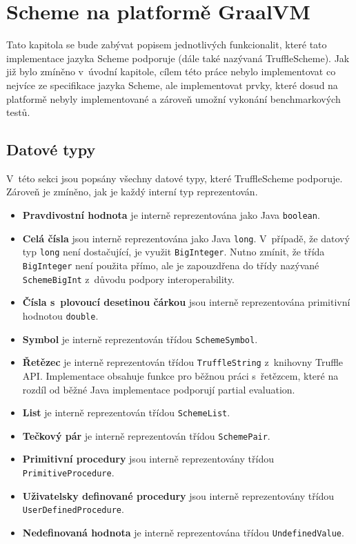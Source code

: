 \documentclass[
  master,
  biblatex,
  figures=true,
  theorems,
  sourcecodes,
  glossaries,
  index
]{kidiplom}
\begin{document}
\clearpage


\section{Scheme na platformě GraalVM}
\label{chapter-scheme-on-graalvm-platform}
Tato kapitola se bude zabývat popisem jednotlivých funkcionalit, které tato implementace jazyka Scheme podporuje (dále také nazývaná TruffleScheme). Jak již bylo zmíněno v~úvodní kapitole, cílem této práce nebylo implementovat co nejvíce ze specifikace jazyka Scheme, ale implementovat prvky, které dosud na platformě nebyly implementované a zároveň umožní vykonání benchmarkových testů.


\subsection{Datové typy}
V~této sekci jsou popsány všechny datové typy, které TruffleScheme podporuje. Zároveň je zmíněno, jak je každý interní typ reprezentován.

\begin{itemize}
    \item \textbf{Pravdivostní hodnota} je interně reprezentována jako Java \texttt{boolean}.
    \item \textbf{Celá čísla} jsou interně reprezentována jako Java \texttt{long}. V~případě, že datový typ \texttt{long} není dostačující, je využit \texttt{BigInteger}. Nutno zmínit, že třída \texttt{BigInteger} není použita přímo, ale je zapouzdřena do třídy nazývané \texttt{SchemeBigInt} z~důvodu podpory interoperability.
    \item \textbf{Čísla s~plovoucí desetinou čárkou} jsou interně reprezentována primitivní hodnotou \texttt{double}.
    \item \textbf{Symbol} je interně reprezentován třídou \texttt{SchemeSymbol}.
    \item \textbf{Řetězec} je interně reprezentován třídou \texttt{TruffleString} z~knihovny Truffle API. Implementace obsahuje funkce pro běžnou práci s~řetězcem, které na rozdíl od běžné Java implementace podporují partial evaluation.
    \item \textbf{List} je interně reprezentován třídou \texttt{SchemeList}. 
    \item \textbf{Tečkový pár} je interně reprezentován třídou \texttt{SchemePair}. 
    \item \textbf{Primitivní procedury} jsou interně reprezentovány třídou \texttt{Primitive\-Procedure}.
    \item \textbf{Uživatelsky definované procedury} jsou interně reprezentovány třídou \texttt{User\-Defined\-Procedure}.
    \item \textbf{Nedefinovaná hodnota} je interně reprezentována třídou \texttt{Undefined\-Value}. 
\end{itemize}
\end{document}
